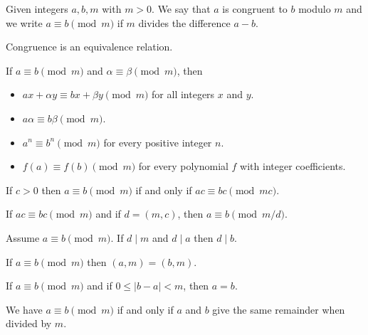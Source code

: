 \begin{defn}
    Given integers $a, b, m$ with $m > 0$.
    We say that $a$ is congruent to $b$ modulo $m$
    and we write $a \equiv b \pmod{m}$
    if $m$ divides the difference $a - b$.
\end{defn}

\begin{theorem}
    Congruence is an equivalence relation.
\end{theorem}

\begin{theorem}
    If $a \equiv b \pmod{m}$ and
    $\alpha \equiv \beta \pmod{m}$, then
    \begin{itemize}
        \item $ax + \alpha y \equiv bx + \beta y \pmod{m}$ for all integers $x$ and $y$.
        \item $a \alpha \equiv b \beta \pmod{m}$.
        \item $a^n \equiv b^n \pmod{m}$ for every positive integer $n$.
        \item $f(a) \equiv f(b) \pmod{m}$ for every polynomial $f$ with integer coefficients.
    \end{itemize}
\end{theorem}

\begin{theorem}
    If $c > 0$ then $a \equiv b \pmod{m}$
    if and only if $ac \equiv bc \pmod{mc}$.
\end{theorem}

\begin{theorem}
    If $ac \equiv bc \pmod{m}$ and if $d = (m, c)$, then
    $a \equiv b \pmod{m/d}$.
\end{theorem}

\begin{theorem}
    Assume $a \equiv b \pmod{m}$.
    If $d \mid m$ and $d \mid a$ then $d \mid b$.
\end{theorem}

\begin{theorem}
    If $a \equiv b \pmod{m}$ then
    $(a, m) = (b, m)$.
\end{theorem}

\begin{theorem}
    If $a \equiv b \pmod{m}$ and if $0 \leq |b - a| < m$,
    then $a = b$.
\end{theorem}

\begin{theorem}
    We have $a \equiv b \pmod{m}$ if and only if
    $a$ and $b$ give the same remainder when divided by $m$.
\end{theorem}

